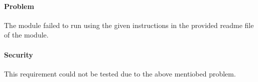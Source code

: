 
\paragraph{Problem }
The module failed to run using the given instructions in the provided readme file of the module.
\paragraph{Security} 
This requirement could not be tested due to the above mentiobed problem.  
	
